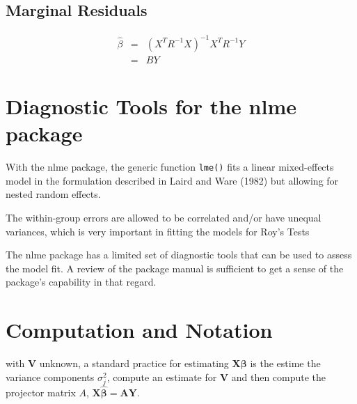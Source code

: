 \documentclass[Main.tex]{subfiles}
\begin{document}
	\subsection{Marginal Residuals}
	\begin{eqnarray}
	\hat{\beta} &=& (X^{T}R^{-1}X)^{-1}X^{T}R^{-1}Y \nonumber \\
	&=& BY \nonumber
	\end{eqnarray}
	
	
	
\section{Diagnostic Tools for the nlme package}


With the nlme package, the generic function \texttt{lme()} fits a linear mixed-effects model in the formulation described in Laird and Ware (1982) but allowing for nested random effects. 

The within-group errors are allowed to be correlated and/or have unequal variances, which is very important in fitting the models for Roy's Tests

The nlme package has a limited set of diagnostic tools that can be used to assess the model fit. A review of the package manual is sufficient to get a sense of the package's capability in that regard.




\section{Computation and Notation } %
with $\boldsymbol{V}$ unknown, a standard practice for estimating $\boldsymbol{X \beta}$ is the estime the variance components $\sigma^2_j$,
compute an estimate for $\boldsymbol{V}$ and then compute the projector matrix $A$, $\boldsymbol{X \hat{\beta}}  = \boldsymbol{AY}$.





\end{document}
